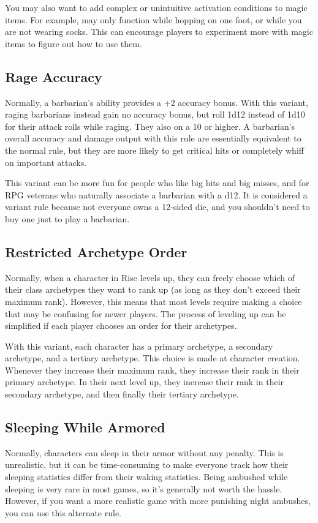     You may also want to add complex or unintuitive activation conditions to magic items.
    For example,  may only function while hopping on one foot, or while you are not wearing socks.
    This can encourage players to experiment more with magic items to figure out how to use them.

  \subsection{Rage Accuracy}
    Normally, a barbarian's  ability provides a +2 accuracy bonus.
    With this variant, raging barbarians instead gain no accuracy bonus, but roll 1d12 instead of 1d10 for their attack rolls while raging.
    They also  on a 10 or higher.
    A barbarian's overall accuracy and damage output with this rule are essentially equivalent to the normal rule, but they are more likely to get critical hits or completely whiff on important attacks.

    This variant can be more fun for people who like big hits and big misses, and for RPG veterans who naturally associate a barbarian with a d12.
    It is considered a variant rule because not everyone owns a 12-sided die, and you shouldn't need to buy one just to play a barbarian.

  \subsection{Restricted Archetype Order}
    Normally, when a character in Rise levels up, they can freely choose which of their class archetypes they want to rank up (as long as they don't exceed their maximum rank).
    However, this means that most levels require making a choice that may be confusing for newer players.
    The process of leveling up can be simplified if each player chooses an order for their archetypes.

    With this variant, each character has a primary archetype, a secondary archetype, and a tertiary archetype.
    This choice is made at character creation.
    Whenever they increase their maximum rank, they increase their rank in their primary archetype.
    In their next level up, they increase their rank in their secondary archetype, and then finally their tertiary archetype.

  \subsection{Sleeping While Armored}
    Normally, characters can sleep in their armor without any penalty.
    This is unrealistic, but it can be time-consuming to make everyone track how their sleeping statistics differ from their waking statistics.
    Being ambushed while sleeping is very rare in most games, so it's generally not worth the hassle.
    However, if you want a more realistic game with more punishing night ambushes, you can use this alternate rule.

